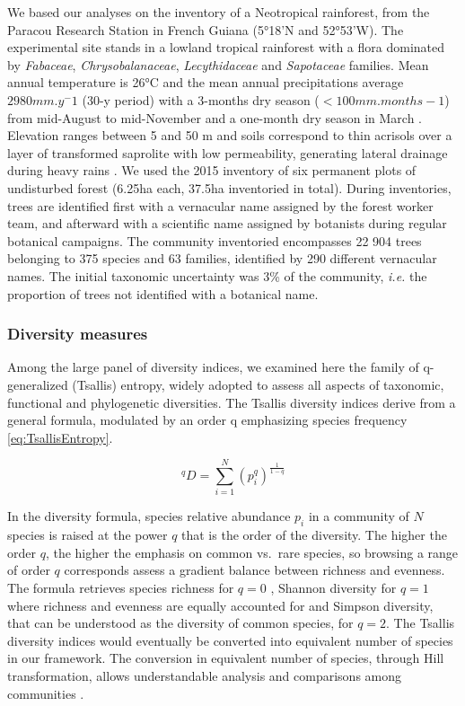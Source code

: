 \documentclass[
  11pt,
  french,
  A4paper,
  extrafontsizes,onecolumn,openright
  ]{memoir}
\begin{document}
We based our analyses on the inventory of a Neotropical rainforest, from
the Paracou Research Station in French Guiana (5°18'N and 52°53'W). The
experimental site stands in a lowland tropical rainforest with a flora
dominated by \emph{Fabaceae}, \emph{Chrysobalanaceae},
\emph{Lecythidaceae} and \emph{Sapotaceae} families. Mean annual
temperature is 26°C and the mean annual precipitations average
\(2980 mm.y^-1\) (30-y period) with a 3-months dry season
(\(< 100 mm.months-1\)) from mid-August to mid-November and a one-month
dry season in March \autocite{Wagner2011}. Elevation ranges between 5
and 50 m and soils correspond to thin acrisols over a layer of
transformed saprolite with low permeability, generating lateral drainage
during heavy rains \autocite{IUSSWorkingGroupWRB2015}. We used the 2015
inventory of six permanent plots of undisturbed forest (6.25ha each,
37.5ha inventoried in total). During inventories, trees are identified
first with a vernacular name assigned by the forest worker team, and
afterward with a scientific name assigned by botanists during regular
botanical campaigns. The community inventoried encompasses 22 904 trees
belonging to 375 species and 63 families, identified by 290 different
vernacular names. The initial taxonomic uncertainty was 3\% of the
community, \emph{i.e.} the proportion of trees not identified with a
botanical name.

\subsubsection{Diversity measures}\label{diversity-measures}

Among the large panel of diversity indices, we examined here the family
of q-generalized (Tsallis) entropy, widely adopted to assess all aspects
of taxonomic, functional and phylogenetic diversities. The Tsallis
diversity indices derive from a general formula, modulated by an order q
emphasizing species frequency \eqref{eq:TsallisEntropy}.

\begin{equation}
^qD = \sum_{i=1}^{N}{\left( p_i^q \right)^{\frac{1}{1-q}} }
\label{eq:TsallisEntropy}
\end{equation}

In the diversity formula, species relative abundance \(p_i\) in a
community of \(N\) species is raised at the power \(q\) that is the
order of the diversity. The higher the order \(q\), the higher the
emphasis on common vs.~rare species, so browsing a range of order \(q\)
corresponds assess a gradient balance between richness and evenness. The
formula retrieves species richness for \(q = 0\) , Shannon diversity for
\(q = 1\) where richness and evenness are equally accounted for and
Simpson diversity, that can be understood as the diversity of common
species, for \(q = 2\). The Tsallis diversity indices would eventually
be converted into equivalent number of species in our framework. The
conversion in equivalent number of species, through Hill transformation,
allows understandable analysis and comparisons among communities
\autocites{Hill1973}{Keylock2005}{Jost2006}.
\end{document}
